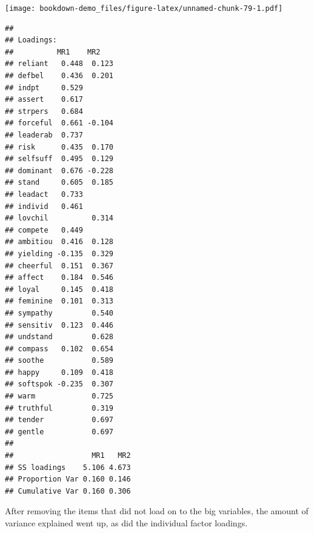\documentclass[]{book}
\newenvironment{Shaded}{\begin{snugshade}}{\end{snugshade}}
\newcommand{\KeywordTok}[1]{\textcolor[rgb]{0.13,0.29,0.53}{\textbf{#1}}}
\newcommand{\DataTypeTok}[1]{\textcolor[rgb]{0.13,0.29,0.53}{#1}}
\newcommand{\DecValTok}[1]{\textcolor[rgb]{0.00,0.00,0.81}{#1}}
\newcommand{\StringTok}[1]{\textcolor[rgb]{0.31,0.60,0.02}{#1}}
\newcommand{\CommentTok}[1]{\textcolor[rgb]{0.56,0.35,0.01}{\textit{#1}}}
\newcommand{\OperatorTok}[1]{\textcolor[rgb]{0.81,0.36,0.00}{\textbf{#1}}}
\newcommand{\NormalTok}[1]{#1}
\theoremstyle{definition}
\theoremstyle{definition}
\theoremstyle{definition}
\theoremstyle{remark}
\begin{document}
\begin{Shaded}
\end{Shaded}

\texttt{[image: bookdown-demo\_files/figure-latex/unnamed-chunk-79-1.pdf]}

\begin{Shaded}
\end{Shaded}

\begin{verbatim}
## 
## Loadings:
##          MR1    MR2   
## reliant   0.448  0.123
## defbel    0.436  0.201
## indpt     0.529       
## assert    0.617       
## strpers   0.684       
## forceful  0.661 -0.104
## leaderab  0.737       
## risk      0.435  0.170
## selfsuff  0.495  0.129
## dominant  0.676 -0.228
## stand     0.605  0.185
## leadact   0.733       
## individ   0.461       
## lovchil          0.314
## compete   0.449       
## ambitiou  0.416  0.128
## yielding -0.135  0.329
## cheerful  0.151  0.367
## affect    0.184  0.546
## loyal     0.145  0.418
## feminine  0.101  0.313
## sympathy         0.540
## sensitiv  0.123  0.446
## undstand         0.628
## compass   0.102  0.654
## soothe           0.589
## happy     0.109  0.418
## softspok -0.235  0.307
## warm             0.725
## truthful         0.319
## tender           0.697
## gentle           0.697
## 
##                  MR1   MR2
## SS loadings    5.106 4.673
## Proportion Var 0.160 0.146
## Cumulative Var 0.160 0.306
\end{verbatim}

After removing the items that did not load on to the big variables, the
amount of variance explained went up, as did the individual factor
loadings.
\end{document}
